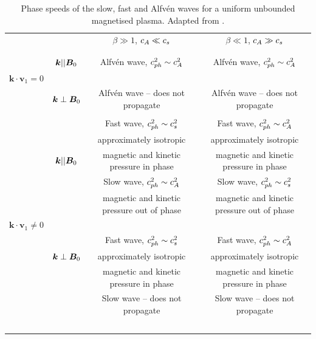     \begin{table}
	    \centering
		\begin{tabular}{lccc}
   			&			& $\beta \gg 1$, $c_A \ll c_s$	&   $\beta \ll 1$, $c_A \gg c_s$ 	 	\\
   			\vspace{-3mm} \\
   			\hline
   			\hline
   			\vspace{-2mm} \\
   			& $\bm{{k}} || \bm{B}_0$		& Alfv\'{e}n wave, $c_{ph}^2 \sim c_A^2$		& Alfv\'{e}n wave, $c_{ph}^2 \sim c_A^2$	\\
   			$\bm{{k}} \cdot \boldsymbol{{v}}_1 = 0$	&					&									&								\\
   			& $\bm{{k}} \perp \bm{B}_0$	& Alfv\'{e}n wave -- does not propagate 		& Alfv\'{e}n wave -- does not propagate	\\
   			\vspace{2mm} \\
   			& 					& Fast wave, $c_{ph}^2 \sim c_s^2$	 		& Fast wave, $c_{ph}^2 \sim c_A^2$		\\
   			& 					& approximately isotropic	 			& approximately isotropic		\\
   			& $\bm{{k}} || \bm{B}_0$		& magnetic and kinetic pressure in phase	& magnetic and kinetic pressure in phase	\\
   			& 					& Slow wave, $c_{ph}^2 \sim c_A^2$	 		& Slow wave, $c_{ph}^2 \sim c_s^2$		\\
   			& 					& magnetic and kinetic pressure out of phase	& magnetic and kinetic pressure out of phase	\\
   			$\bm{{k}} \cdot \boldsymbol{{v}}_1 \neq 0$&					&									&							\\
   			& 					& Fast wave, $c_{ph}^2 \sim c_s^2$	 		& Fast wave, $c_{ph}^2 \sim c_A^2$		\\
   			& $\bm{{k}} \perp \bm{B}_0$	& approximately isotropic	 			& approximately isotropic		\\
   			& 					& magnetic and kinetic pressure in phase	& magnetic and kinetic pressure in phase	\\
   			& 					& Slow wave -- does not propagate	 		& Slow wave -- does not propagate		\\
   			\hline
   			~&~&~ \\
   		\end{tabular}
		\caption{
				 Phase speeds of the slow, fast and Alfv\'{e}n waves for a uniform unbounded magnetised plasma.
			     Adapted from \cite{jess2015multiwavelength}.
			    }
		\label{tab:uniform_medium}
     \end{table}
     
